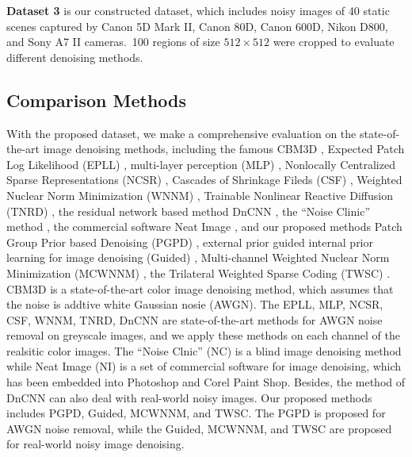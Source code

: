 \textbf{Dataset 3} is our constructed dataset, which includes noisy images of 40 static scenes captured by Canon 5D Mark II, Canon 80D, Canon 600D, Nikon D800, and Sony A7 II cameras.\ 100 regions of size $512\times512$ were cropped to evaluate different denoising methods.


\subsection{Comparison Methods}

With the proposed dataset, we make a comprehensive evaluation on the state-of-the-art image denoising methods, including the famous CBM3D \cite{cbm3d}, Expected Patch Log Likelihood (EPLL) \cite{epll}, multi-layer perception (MLP) \cite{mlp}, Nonlocally Centralized Sparse Representations (NCSR) \cite{ncsr}, Cascades of Shrinkage Fileds (CSF) \cite{csf}, Weighted Nuclear Norm Minimization (WNNM) \cite{wnnm}, Trainable Nonlinear Reactive Diffusion (TNRD) \cite{tnrd}, the residual network based method DnCNN \cite{dncnn}, the ``Noise Clinic'' method \cite{noiseclinic,ncwebsite}, the commercial software Neat Image \cite{neatimage}, and our proposed methods Patch Group Prior based Denoising (PGPD) \cite{pgpd}, external prior guided internal prior learning for image denoising (Guided) \cite{guided}, Multi-channel Weighted Nuclear Norm Minimization (MCWNNM) \cite{mcwnnm}, the Trilateral Weighted Sparse Coding (TWSC) \cite{twsc}. CBM3D is a state-of-the-art color image denoising method, which assumes that the noise is addtive white Gaussian nosie (AWGN). The EPLL, MLP, NCSR, CSF, WNNM, TNRD, DnCNN are state-of-the-art methods for AWGN noise removal on greyscale images, and we apply these methods on each channel of the realsitic color images.  The ``Noise Clnic'' (NC) is a blind image denoising method while Neat Image (NI) is a set of commercial software for image denoising, which has been embedded into Photoshop and Corel Paint Shop. Besides, the method of DnCNN \cite{dncnn} can also deal with real-world noisy images. Our proposed methods includes PGPD, Guided, MCWNNM, and TWSC. The PGPD is proposed for AWGN noise removal, while the Guided, MCWNNM, and TWSC are proposed for real-world noisy image denoising.

